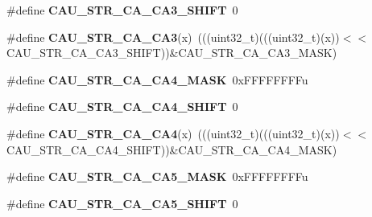 \begin{DoxyCompactItemize}
\item 
\#define {\bfseries C\+A\+U\+\_\+\+S\+T\+R\+\_\+\+C\+A\+\_\+\+C\+A3\+\_\+\+S\+H\+I\+FT}~0\hypertarget{group__CAU__Register__Masks_gac71abdf9ef9823b10c9d3e57bcc3e197}{}\label{group__CAU__Register__Masks_gac71abdf9ef9823b10c9d3e57bcc3e197}

\item 
\#define {\bfseries C\+A\+U\+\_\+\+S\+T\+R\+\_\+\+C\+A\+\_\+\+C\+A3}(x)~(((uint32\+\_\+t)(((uint32\+\_\+t)(x))$<$$<$C\+A\+U\+\_\+\+S\+T\+R\+\_\+\+C\+A\+\_\+\+C\+A3\+\_\+\+S\+H\+I\+FT))\&C\+A\+U\+\_\+\+S\+T\+R\+\_\+\+C\+A\+\_\+\+C\+A3\+\_\+\+M\+A\+SK)\hypertarget{group__CAU__Register__Masks_gaf9892859cb2b2bbe38df4ca6530e2780}{}\label{group__CAU__Register__Masks_gaf9892859cb2b2bbe38df4ca6530e2780}

\item 
\#define {\bfseries C\+A\+U\+\_\+\+S\+T\+R\+\_\+\+C\+A\+\_\+\+C\+A4\+\_\+\+M\+A\+SK}~0x\+F\+F\+F\+F\+F\+F\+F\+Fu\hypertarget{group__CAU__Register__Masks_ga201a5c7621a22e47519189370bcdb769}{}\label{group__CAU__Register__Masks_ga201a5c7621a22e47519189370bcdb769}

\item 
\#define {\bfseries C\+A\+U\+\_\+\+S\+T\+R\+\_\+\+C\+A\+\_\+\+C\+A4\+\_\+\+S\+H\+I\+FT}~0\hypertarget{group__CAU__Register__Masks_gaf22d48103a45462f4f1c412212b28941}{}\label{group__CAU__Register__Masks_gaf22d48103a45462f4f1c412212b28941}

\item 
\#define {\bfseries C\+A\+U\+\_\+\+S\+T\+R\+\_\+\+C\+A\+\_\+\+C\+A4}(x)~(((uint32\+\_\+t)(((uint32\+\_\+t)(x))$<$$<$C\+A\+U\+\_\+\+S\+T\+R\+\_\+\+C\+A\+\_\+\+C\+A4\+\_\+\+S\+H\+I\+FT))\&C\+A\+U\+\_\+\+S\+T\+R\+\_\+\+C\+A\+\_\+\+C\+A4\+\_\+\+M\+A\+SK)\hypertarget{group__CAU__Register__Masks_gaaea02f5a37b0a49374d83562863cda67}{}\label{group__CAU__Register__Masks_gaaea02f5a37b0a49374d83562863cda67}

\item 
\#define {\bfseries C\+A\+U\+\_\+\+S\+T\+R\+\_\+\+C\+A\+\_\+\+C\+A5\+\_\+\+M\+A\+SK}~0x\+F\+F\+F\+F\+F\+F\+F\+Fu\hypertarget{group__CAU__Register__Masks_ga4b0911976e175086b6459ec3d90c1653}{}\label{group__CAU__Register__Masks_ga4b0911976e175086b6459ec3d90c1653}

\item 
\#define {\bfseries C\+A\+U\+\_\+\+S\+T\+R\+\_\+\+C\+A\+\_\+\+C\+A5\+\_\+\+S\+H\+I\+FT}~0\hypertarget{group__CAU__Register__Masks_ga550505d55e65ebb24f8b93829fc709dc}{}\label{group__CAU__Register__Masks_ga550505d55e65ebb24f8b93829fc709dc}


\end{DoxyCompactItemize}

